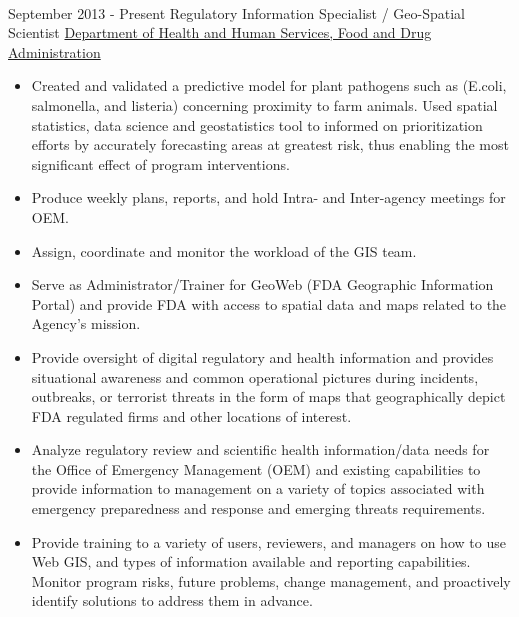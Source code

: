 \documentclass[letterpaper]{twentysecondcv} %
\begin{document}
\begin{twenty}
{{\begin{itemize}
    \end{itemize}}
        }
     \\
     \end{twenty}

\begin{twenty}
 \twentyitem
    	{September 2013 -}
		{Present}
        {Regulatory Information Specialist / Geo-Spatial Scientist}        {\href{http://www.fda.gov/}{Department of Health and Human Services, Food and Drug Administration 
}}
        {}
        {
        {\begin{itemize}
 \item	Created and validated a predictive model for plant pathogens such as (E.coli, salmonella, and listeria) concerning proximity to farm animals. Used spatial statistics, data science and geostatistics tool to informed on prioritization efforts by accurately forecasting areas at greatest risk, thus enabling the most significant effect of program interventions.
  \vspace{1mm}
  \item	Produce weekly plans, reports, and hold Intra- and Inter-agency meetings for OEM.
  \vspace{1mm}
\item Assign, coordinate and monitor the workload of the GIS team.
  \vspace{1mm}
\item	Serve as Administrator/Trainer for GeoWeb (FDA Geographic Information Portal) and provide FDA with access to spatial data and maps related to the Agency’s mission.
  \vspace{1mm}
\item	Provide oversight of digital regulatory and health information and provides situational awareness and common operational pictures during incidents, outbreaks, or terrorist threats in the form of maps that geographically depict FDA regulated firms and other locations of interest.
 \vspace{1mm}
\item	Analyze regulatory review and scientific health information/data needs for the Office of Emergency Management (OEM) and  existing capabilities to provide information to management on a variety of topics associated with emergency preparedness and response and emerging threats requirements.
\vspace{1mm}
\item	Provide training to a variety of users, reviewers, and managers on how to use Web GIS, and types of information available and reporting capabilities. Monitor program risks, future problems, change management, and proactively identify solutions to address them in advance.

\end{itemize}}}
\end{twenty}
\end{document}
